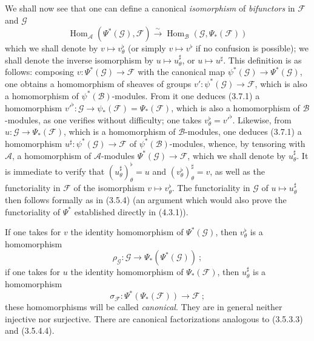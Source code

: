 \begin{env}[4.4.3]
\label{0.4.4.3}
We shall now see that one can define a canonical \emph{isomorphism}
of \emph{bifunctors} in $\mathcal{F}$ and $\mathcal{G}$
\[
  \operatorname{Hom}_{\mathcal{A}}(\Psi^*(\mathcal{G}),\mathcal{F})
  \xrightarrow{\sim}
  \operatorname{Hom}_{\mathcal{B}}(\mathcal{G},\Psi_*(\mathcal{F}))
  \tag{4.4.3.1}\label{0.4.4.3.1}
\]
which we shall denote by $v\mapsto v_\theta^\flat$ (or simply
$v\mapsto v^\flat$ if no confusion is possible); we shall denote the
inverse isomorphism by $u\mapsto u_\theta^\sharp$, or $u\mapsto u^\sharp$.
This definition is as follows: composing
$v:\Psi^*(\mathcal{G})\to\mathcal{F}$ with the canonical map
$\psi^*(\mathcal{G})\to\Psi^*(\mathcal{G})$, one obtains a homomorphism of
sheaves of groups $v':\psi^*(\mathcal{G})\to\mathcal{F}$, which is also a
homomorphism of $\psi^*(\mathcal{B})$-modules. From it one deduces (3.7.1) a
homomorphism
${v'}^\flat:\mathcal{G}\to\psi_*(\mathcal{F})=\Psi_*(\mathcal{F})$, which is
also a homomorphism of $\mathcal{B}$-modules, as one
verifies without difficulty; one takes $v_\theta^\flat={v'}^\flat$. Likewise, from
$u:\mathcal{G}\to\Psi_*(\mathcal{F})$, which is a homomorphism of
$\mathcal{B}$-modules, one deduces (3.7.1) a homomorphism
$u^\sharp:\psi^*(\mathcal{G})\to\mathcal{F}$ of
$\psi^*(\mathcal{B})$-modules, whence, by tensoring with $\mathcal{A}$, a
homomorphism of $\mathcal{A}$-modules
$\Psi^*(\mathcal{G})\to\mathcal{F}$, which we shall denote by
$u_\theta^\sharp$. It is immediate to verify that
$(u_\theta^\sharp)_\theta^\flat=u$ and
$(v_\theta^\flat)_\theta^\sharp=v$, as well as the functoriality in
$\mathcal{F}$ of the isomorphism $v\mapsto v_\theta^\flat$. The
functoriality in $\mathcal{G}$ of $u\mapsto u_\theta^\sharp$ then follows
formally as in (3.5.4) (an argument which would also prove the
functoriality of $\Psi^*$ established directly in (4.3.1)).

If one takes for $v$ the identity homomorphism of $\Psi^*(\mathcal{G})$,
then $v_\theta^\flat$ is a homomorphism
\[
  \rho_{\mathcal{G}}:\mathcal{G}\longrightarrow
  \Psi_*(\Psi^*(\mathcal{G}))~;
  \tag{4.4.3.2}\label{0.4.4.3.2}
\]
if one takes for $u$ the identity homomorphism of $\Psi_*(\mathcal{F})$,
then $u_\theta^\sharp$ is a homomorphism
\[
  \sigma_{\mathcal{F}}:\Psi^*(\Psi_*(\mathcal{F}))
  \longrightarrow\mathcal{F}~;
  \tag{4.4.3.3}\label{0.4.4.3.3}
\]
these homomorphisms will be called \emph{canonical}. They are in general neither
injective nor surjective. There are canonical factorizations analogous to
(3.5.3.3) and (3.5.4.4).


\end{env}
